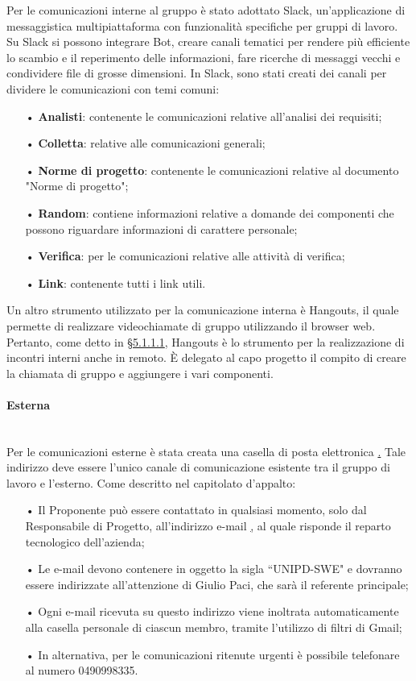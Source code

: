 Per le comunicazioni interne al gruppo è stato adottato {Slack}, un'applicazione di messaggistica multipiattaforma con funzionalità specifiche per gruppi di lavoro.  
\newline
Su Slack si possono integrare {Bot}, creare canali tematici per rendere più efficiente lo scambio e il reperimento delle informazioni, fare ricerche di messaggi vecchi e condividere file di grosse dimensioni.   
\newline
In Slack, sono stati creati dei canali per dividere le comunicazioni con temi comuni:
\begin{itemize}
\item[•] \textbf{Analisti}: contenente le comunicazioni relative all'analisi dei requisiti;
\item[•] \textbf{Colletta}: relative alle comunicazioni generali;
\item[•] \textbf{Norme di progetto}: contenente le comunicazioni relative al documento "Norme di progetto";
\item[•] \textbf{Random}: contiene informazioni relative a domande dei componenti che possono riguardare informazioni di carattere personale;
\item[•] \textbf{Verifica}: per le comunicazioni relative alle attività di verifica;
\item[•] \textbf{Link}: contenente tutti i link utili.
\end{itemize}
Un altro strumento utilizzato per la comunicazione interna è Hangouts, il quale permette di realizzare videochiamate di gruppo utilizzando il browser web. Pertanto, come detto in \hyperref[sec:interni]{§5.1.1.1}, Hangouts è lo strumento per la realizzazione di incontri interni anche in remoto. \uppercase{è} delegato al capo progetto il compito di creare la chiamata di gruppo e aggiungere i vari componenti.
\paragraph{Esterna}\mbox{}\\
Per le comunicazioni esterne è stata creata una casella di posta elettronica \href{SWEight@gmail.com}.
\newline 
Tale indirizzo deve essere l'unico canale di comunicazione esistente tra il gruppo di lavoro e l'esterno. 
\newline
Come descritto nel capitolato d'appalto: 
\begin{itemize}
\item[•] Il Proponente può essere contattato in qualsiasi momento, solo dal Responsabile di Progetto, all'indirizzo e-mail \href{tech@mivoq.it} , al quale risponde il reparto tecnologico dell'azienda;
\item[•] Le e-mail devono contenere in oggetto la sigla “UNIPD-SWE" e dovranno essere indirizzate all'attenzione di Giulio Paci, che sarà il referente principale;
\item[•] Ogni e-mail ricevuta su questo indirizzo viene inoltrata automaticamente alla casella personale di ciascun membro, tramite l'utilizzo di filtri di Gmail;
\item[•] In alternativa, per le comunicazioni ritenute urgenti è possibile telefonare al numero 0490998335.
\end{itemize}

